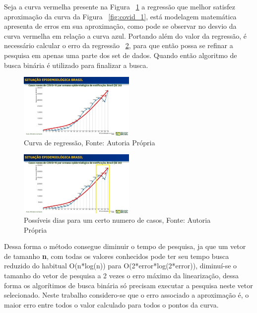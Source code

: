 Seja a curva vermelha presente na Figura ~\ref{fig:covid_2} a regressão que melhor satisfez aproximação da curva da Figura ~\ref{fig:covid_1}, 
está modelagem matemática apresenta de erros em sua aproximação, como pode se observar no desvio da curva vermelha em relação a curva azul.
Portando além do valor da regressão, é necessário calcular o erro da regressão ~\ref{fig:covid_3}, para que então possa se refinar a pesquisa em apenas uma parte dos set de dados.
Quando então algoritmo de busca binária é utilizado para finalizar a busca.
\begin{figure}[H]
    \centering
    \includegraphics[width=0.5\textwidth]{images/covid_2.jpg}
    \caption{Curva de regressão, Fonte: Autoria Própria}
    \label{fig:covid_2}
\end{figure}

\begin{figure}[H]
    \centering
    \includegraphics[width=0.5\textwidth]{images/covid_3.jpg}
    \caption{Possíveis dias para um certo numero de casos, Fonte: Autoria Própria}
    \label{fig:covid_3}
\end{figure}

Dessa forma o método consegue diminuir o tempo de pesquisa, ja que um vetor de tamanho \textbf{n}, com todas os valores conhecidos pode ter seu tempo busca reduzido do habitual O(n*log(n)) para O(2*error*log(2*error)), 
diminuí-se o tamanho do vetor de pesquisa a 2 vezes o erro máximo da linearização, dessa forma os algorítimos de busca binária só precisam executar a pesquisa neste vetor selecionado.
Neste trabalho considero-se que o erro associado a aproximação é, o maior erro entre todos o valor calculado para todos o pontos da curva.
